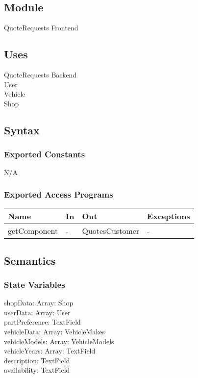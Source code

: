 \documentclass[12pt, titlepage]{article}
\begin{document}
\subsection{Module}

QuoteRequests Frontend

\subsection{Uses}

QuoteRequests Backend \\
User \\ 
Vehicle \\
Shop

\subsection{Syntax}

\subsubsection{Exported Constants}

N/A

\subsubsection{Exported Access Programs}

\begin{center}
    \begin{tabular}{p{2cm} p{4cm} p{4cm} p{2cm}}
    \hline
    \textbf{Name} & \textbf{In} & \textbf{Out} & \textbf{Exceptions} \\
    \hline
     getComponent & - & QuotesCustomer & - \\
    \hline
    \end{tabular}
\end{center}

\subsection{Semantics}

\subsubsection{State Variables}

shopData: Array: Shop \\
userData: Array: User \\
partPreference: TextField \\
vehicleData: Array: VehicleMakes \\
vehicleModels: Array: VehicleModels \\
vehicleYears: Array: TextField \\
description: TextField \\
availability: TextField \\
\end{document}
